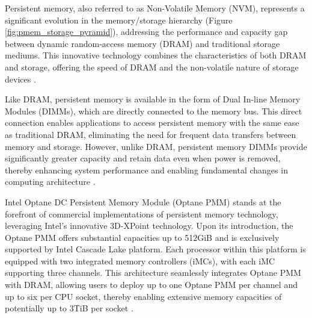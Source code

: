 Persistent memory, also referred to as Non-Volatile Memory (NVM), represents a significant evolution in the memory/storage hierarchy (Figure \ref{fig:pmem_storage_pyramid}), addressing the performance and capacity gap between dynamic random-access memory (DRAM) and traditional storage mediums. This innovative technology combines the characteristics of both DRAM and storage, offering the speed of DRAM and the non-volatile nature of storage devices \cite{scargall2020pmem}.

Like DRAM, persistent memory is available in the form of Dual In-line Memory Modules (DIMMs), which are directly connected to the memory bus. This direct connection enables applications to access persistent memory with the same ease as traditional DRAM, eliminating the need for frequent data transfers between memory and storage. However, unlike DRAM, persistent memory DIMMs provide significantly greater capacity and retain data even when power is removed, thereby enhancing system performance and enabling fundamental changes in computing architecture \cite{rudoff2017persistent,scargall2020pmem}.


Intel Optane DC Persistent Memory Module (Optane PMM) stands at the forefront of commercial implementations of persistent memory technology, leveraging Intel's innovative 3D-XPoint technology. Upon its introduction, the Optane PMM offers substantial capacities up to 512GiB and is exclusively supported by Intel Cascade Lake platform. Each processor within this platform is equipped with two integrated memory controllers (iMCs), with each iMC supporting three channels. This architecture seamlessly integrates Optane PMM with DRAM, allowing users to deploy up to one Optane PMM per channel and up to six per CPU socket, thereby enabling extensive memory capacities of potentially up to 3TiB per socket \cite{yang2020empirical,izraelevitz2019basic}.

